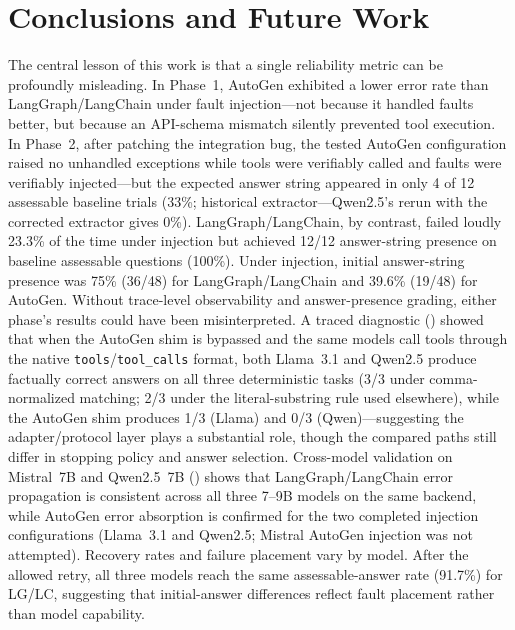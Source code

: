 \documentclass[make,article,submit,moreauthors,pdftex]{mdpi}
\newcommand{\Wrev}[1]{\texorpdfstring{{\color{RevisionOrange}#1}}{#1}}
\begin{document}
\section{Conclusions and Future Work}\label{sec:conclusion}

The central lesson of this work is that a single reliability metric can be profoundly misleading. In Phase~1, AutoGen exhibited a lower error rate than LangGraph/LangChain under fault injection---not because it handled faults better, but because an API-schema mismatch silently prevented tool execution. In Phase~2, after patching the integration bug, \Wrev{the tested AutoGen configuration raised no unhandled exceptions} while tools were verifiably called and faults were verifiably injected---but the expected answer string appeared in only 4 of 12 assessable baseline trials (33\%; historical extractor---Qwen2.5's rerun with the corrected extractor gives 0\%). LangGraph/LangChain, by contrast, failed loudly 23.3\% of the time under injection but achieved 12/12 answer-string presence on baseline assessable questions (100\%). Under injection, initial answer-string presence was 75\% (36/48) for LangGraph/LangChain and 39.6\% (19/48) for AutoGen. Without trace-level observability and answer-presence grading, either phase's results could have been misinterpreted. A traced diagnostic () showed that when the AutoGen shim is bypassed and the same models call tools through the native \texttt{tools}/\texttt{tool\_calls} format, both Llama~3.1 and Qwen2.5 produce factually correct answers on all three deterministic tasks (3/3 under comma-normalized matching; 2/3 under the literal-substring rule used elsewhere), while the AutoGen shim produces 1/3 (Llama) and 0/3 (Qwen)---suggesting the adapter/protocol layer plays a substantial role, though the compared paths still differ in stopping policy and answer selection. Cross-model validation on Mistral~7B and Qwen2.5~7B () shows that LangGraph/LangChain error propagation is consistent across all three 7--9B models on the same backend, while AutoGen error absorption is confirmed for the two completed injection configurations (Llama~3.1 and Qwen2.5; Mistral AutoGen injection was not attempted). Recovery rates and failure placement vary by model. After the allowed retry, all three models reach the same assessable-answer rate (91.7\%) for LG/LC, suggesting that initial-answer differences reflect fault placement rather than model capability.
\end{document}

